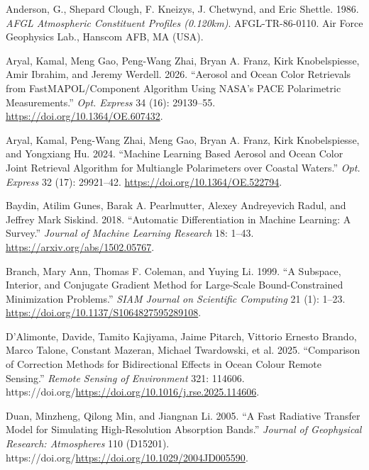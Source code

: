 \documentclass[
  letterpaper,
  open=any]{scrbook}
\newlength{\cslhangindent}
\newenvironment{CSLReferences}[2] %
 {\begin{list}{}{%
  \setlength{\itemindent}{0pt}
  \setlength{\leftmargin}{0pt}
  \setlength{\parsep}{0pt}
  \ifodd #1
   \setlength{\leftmargin}{\cslhangindent}
   \setlength{\itemindent}{-1\cslhangindent}
  \fi
  \setlength{\itemsep}{#2\baselineskip}}}
 {\end{list}}
\begin{document}
\label{refs}
\begin{CSLReferences}{1}{0}
Anderson, G., Shepard Clough, F. Kneizys, J. Chetwynd, and Eric Shettle.
1986. \emph{AFGL Atmospheric Constituent Profiles (0.120km)}.
AFGL-TR-86-0110. Air Force Geophysics Lab., Hanscom AFB, MA (USA).

Aryal, Kamal, Meng Gao, Peng-Wang Zhai, Bryan A. Franz, Kirk
Knobelspiesse, Amir Ibrahim, and Jeremy Werdell. 2026. {``Aerosol and
Ocean Color Retrievals from FastMAPOL/Component Algorithm Using NASA's
PACE Polarimetric Measurements.''} \emph{Opt. Express} 34 (16):
29139--55. \url{https://doi.org/10.1364/OE.607432}.

Aryal, Kamal, Peng-Wang Zhai, Meng Gao, Bryan A. Franz, Kirk
Knobelspiesse, and Yongxiang Hu. 2024. {``Machine Learning Based Aerosol
and Ocean Color Joint Retrieval Algorithm for Multiangle Polarimeters
over Coastal Waters.''} \emph{Opt. Express} 32 (17): 29921--42.
\url{https://doi.org/10.1364/OE.522794}.

Baydin, Atilim Gunes, Barak A. Pearlmutter, Alexey Andreyevich Radul,
and Jeffrey Mark Siskind. 2018. {``Automatic Differentiation in Machine
Learning: A Survey.''} \emph{Journal of Machine Learning Research} 18:
1--43. \url{https://arxiv.org/abs/1502.05767}.

Branch, Mary Ann, Thomas F. Coleman, and Yuying Li. 1999. {``A Subspace,
Interior, and Conjugate Gradient Method for Large-Scale
Bound-Constrained Minimization Problems.''} \emph{SIAM Journal on
Scientific Computing} 21 (1): 1--23.
\url{https://doi.org/10.1137/S1064827595289108}.

D'Alimonte, Davide, Tamito Kajiyama, Jaime Pitarch, Vittorio Ernesto
Brando, Marco Talone, Constant Mazeran, Michael Twardowski, et al. 2025.
{``Comparison of Correction Methods for Bidirectional Effects in Ocean
Colour Remote Sensing.''} \emph{Remote Sensing of Environment} 321:
114606. https://doi.org/\url{https://doi.org/10.1016/j.rse.2025.114606}.

Duan, Minzheng, Qilong Min, and Jiangnan Li. 2005. {``A Fast Radiative
Transfer Model for Simulating High-Resolution Absorption Bands.''}
\emph{Journal of Geophysical Research: Atmospheres} 110 (D15201).
https://doi.org/\url{https://doi.org/10.1029/2004JD005590}.


\end{CSLReferences}
\end{document}
